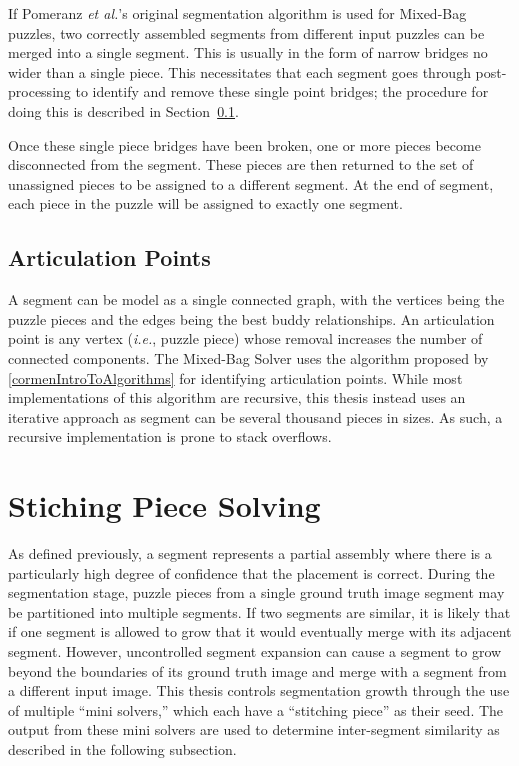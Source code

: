 If Pomeranz \textit{et al.}'s original segmentation algorithm is used for Mixed-Bag puzzles, two correctly assembled segments from different input puzzles can be merged into a single segment.  This is usually in the form of narrow bridges no wider than a single piece. This necessitates that each segment goes through post-processing to identify and remove these single point bridges; the procedure for doing this is described in Section~\ref{sec:ArticulationPoints}.  

Once these single piece bridges have been broken, one or more pieces become disconnected from the segment.  These pieces are then returned to the set of unassigned pieces to be assigned to a different segment.  At the end of segment, each piece in the puzzle will be assigned to exactly one segment.

\subsection{Articulation Points}\label{sec:ArticulationPoints}

A segment can be model as a single connected graph, with the vertices being the puzzle pieces and the edges being the best buddy relationships.  An articulation point is any vertex (\textit{i.e.}, puzzle piece) whose removal increases the number of connected components.  The Mixed-Bag Solver uses the algorithm proposed by \ref{cormenIntroToAlgorithms} for identifying articulation points.  While most implementations of this algorithm are recursive, this thesis instead uses an iterative approach as segment can be several thousand pieces in sizes.  As such, a recursive implementation is prone to stack overflows.

\section{Stiching Piece Solving}\label{sec:stitchingPieceSolving}

As defined previously, a segment represents a partial assembly where there is a particularly high degree of confidence that the placement is correct. During the segmentation stage, puzzle pieces from a single ground truth image segment may be partitioned into multiple segments. If two segments are similar, it is likely that if one segment is allowed to grow that it would eventually merge with its adjacent segment.  However, uncontrolled segment expansion can cause a segment to grow beyond the boundaries of its ground truth image and merge with a segment from a different input image.  This thesis controls segmentation growth through the use of multiple ``mini solvers,'' which each have a ``stitching piece'' as their seed.  The output from these mini solvers are used to determine inter-segment similarity as described in the following subsection.

